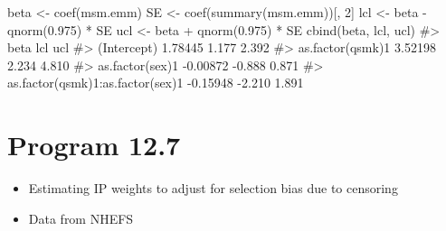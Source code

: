 \documentclass[
  10pt,
  a4paper,
]{book}
\newenvironment{Shaded}{\begin{snugshade}}{\end{snugshade}}
\newcommand{\CommentTok}[1]{\textcolor[rgb]{0.37,0.37,0.37}{#1}}
\newcommand{\DecValTok}[1]{\textcolor[rgb]{0.68,0.00,0.00}{#1}}
\newcommand{\FloatTok}[1]{\textcolor[rgb]{0.68,0.00,0.00}{#1}}
\newcommand{\FunctionTok}[1]{\textcolor[rgb]{0.28,0.35,0.67}{#1}}
\newcommand{\NormalTok}[1]{\textcolor[rgb]{0.00,0.46,0.62}{#1}}
\newcommand{\OtherTok}[1]{\textcolor[rgb]{0.00,0.46,0.62}{#1}}
\newcommand{\SpecialCharTok}[1]{\textcolor[rgb]{0.37,0.37,0.37}{#1}}
\providecommand{\tightlist}{%
  \setlength{\itemsep}{0pt}\setlength{\parskip}{0pt}}
\begin{document}
\begin{Shaded}
\begin{Highlighting}[]
\NormalTok{beta }\OtherTok{\textless{}{-}} \FunctionTok{coef}\NormalTok{(msm.emm)}
\NormalTok{SE }\OtherTok{\textless{}{-}} \FunctionTok{coef}\NormalTok{(}\FunctionTok{summary}\NormalTok{(msm.emm))[, }\DecValTok{2}\NormalTok{]}
\NormalTok{lcl }\OtherTok{\textless{}{-}}\NormalTok{ beta }\SpecialCharTok{{-}} \FunctionTok{qnorm}\NormalTok{(}\FloatTok{0.975}\NormalTok{) }\SpecialCharTok{*}\NormalTok{ SE}
\NormalTok{ucl }\OtherTok{\textless{}{-}}\NormalTok{ beta }\SpecialCharTok{+} \FunctionTok{qnorm}\NormalTok{(}\FloatTok{0.975}\NormalTok{) }\SpecialCharTok{*}\NormalTok{ SE}
\FunctionTok{cbind}\NormalTok{(beta, lcl, ucl)}
\CommentTok{\#\textgreater{}                                      beta    lcl   ucl}
\CommentTok{\#\textgreater{} (Intercept)                       1.78445  1.177 2.392}
\CommentTok{\#\textgreater{} as.factor(qsmk)1                  3.52198  2.234 4.810}
\CommentTok{\#\textgreater{} as.factor(sex)1                  {-}0.00872 {-}0.888 0.871}
\CommentTok{\#\textgreater{} as.factor(qsmk)1:as.factor(sex)1 {-}0.15948 {-}2.210 1.891}
\end{Highlighting}
\end{Shaded}

\section{Program 12.7}\label{program-12.7}

\begin{itemize}
\tightlist
\item
  Estimating IP weights to adjust for selection bias due to censoring
\item
  Data from NHEFS
\end{itemize}
\end{document}
